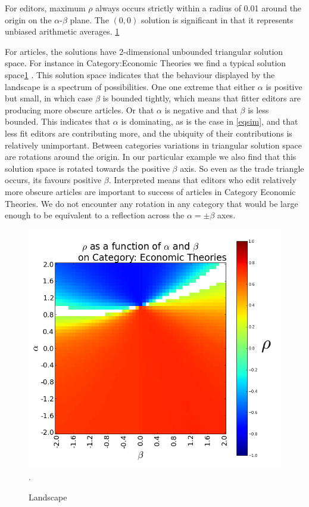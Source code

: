 For editors, maximum $\rho$ always occurs strictly within a radius of 0.01 around the origin on the  $\alpha$-$\beta$ plane. The $(0,0)$ solution is significant in that it represents unbiased arithmetic averages.
\ref{fig:landscape}

For articles, the solutions have 2-dimensional unbounded triangular solution space. For instance in Category:Economic Theories we find a typical solution space\ref{fig:landscape} . This solution space indicates that the behaviour displayed by the  landscape is a spectrum of possibilities. One one extreme that either $\alpha$ is positive but small, in which case $\beta$ is bounded tightly, which means that fitter editors are producing more obscure articles. Or that $\alpha$ is negative and that $\beta$ is less bounded. This indicates that $\alpha$ is dominating, as is the case in \eqref{eqsim}, and that less fit editors are contributing more, and the ubiquity of their contributions is relatively unimportant. Between categories variations in triangular solution space are rotations around the origin. In our particular example we also find that this solution space is rotated towards the positive $\beta$ axis. So even as the trade triangle occurs, its favours positive $\beta$. Interpreted means that editors who edit relatively more obscure articles are important to success of articles in Category Economic Theories. We do not encounter any rotation in any category that would be large enough to be equivalent to a reflection across the $\alpha = \pm \beta$ axes.

\begin{figure}[!t]
\centering
\includegraphics[width=0.9\columnwidth]{Figures/landscape.png}.
\caption{Landscape}
\label{fig:landscape}
\end{figure}

